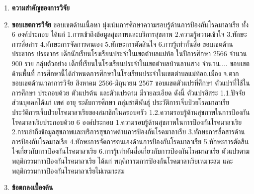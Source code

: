 \begin{titlepage}
\begin{flushleft}
\begin{enumerate}
    
    \lipsum[1-1]

    \item\textbf{ความสำคัญของการวิจัย}
    
    \lipsum[1-1]

    \item\textbf{ขอบเขตการวิจัย}
  ขอบเขตด้านเนื้อหา
    มุ่งเน้นการศึกษาความรอบรู้ด้านการป้องกันโรคมาลาเรีย ทั้ง 6 องค์ประกอบ ได้แก่ 1.การเข้าถึงข้อมูลสุขภาพและบริการสุขภาพ 2.ความรู้ความเข้าใจ 3.ทักษะการสื่อสาร 4.ทักษะการจัดการตนเอง 5.ทักษะการตัดสินใจ 6.การรู้เท่าทั้นสื่อ
  ขอบเขตด้านประชากร
    ประชากร เด็กนักเรียนโรงเรียนประจำในเขตตำบลแม่ท้อ ในปีการศึกษา 2566 จำนวน 900 ราย
    กลุ่มตัวอย่าง เด็กที่เรียนในโรงเรียนประจำในเขตตำบลบ้านลานสาง จำนวน....
  ขอบเขตด้านพื้นที่
    การศึกษานี้ได้กำหนดการศึกษาในโรงเรียนประจำในเขตตำบลแม่ท้ออ.เมือง จ.ตาก 
  ขอบเขตด้านเวลาการวิจัย
    สิงหาคม 2566-มิถุนายน 2567
  ขอบแขตตัวแปรที่ศึกษา
    ตัวแปรที่ใช้ในการศึกษา ประกอบด้วย ตัวแปรต้น และตัวแปรตาม มีรายละเอียด ดังนี้
    ตัวแปรอิสระ 
    1.1.ปัจจัยส่วนบุคคลได้แก่ เพศ อายุ ระดับการศึกษา กลุ่มชาติพันธุ์ ประวัติการเจ็บป่วยโรคมาลาเรีย ประวัติการเจ็บป่วยโรคมาลาเรียของสมาชิกในครอบครัว
    1.2.ความรอบรู้ด้านสุขภาพในการป้องกันโรคมาลาเรียประกอบด้วย 6 องค์ประกอบ 1.ความรอบรู้ด้านสุขภาพในการป้องกันโรคมาลาเรีย 2.การเข้าถึงข้อมูลสุขภาพและบริการสุขภาพด้านการป้องกันโรคมาลาเรีย 3.ทักษะการสื่อสารด้านการป้องกันโรคมาลเรีย 4.ทักษะการจัดการตนเองด้านการป้องกันโรคมาลาเรีย 5.ทักษะการตัดสินใจเกี่ยวกับการป้องกันโรคมาลาเรีย 6.การรู้เท่าทันสื่อเกี่ยวกับการป้องกันโรคมาลาเรีย
    ตัวแปรตาม
    พฤติกรรมการป้องกันโรคมาลาเรีย ได้แก่ พฤติกรรมการป้องกันโรคมาลาเรียเหมาะสม และพฤติกรรมการป้องกันโรคมาลาเรียไม่เหมาะสม

    \lipsum[1-1]

    \item\textbf{ข้อตกลงเบื้องต้น}
    
    \lipsum[1-1]


\end{enumerate}
\end{flushleft}
\end{titlepage}
